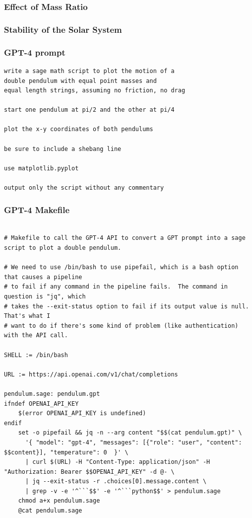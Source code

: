 \documentclass{beamer}
\begin{document}
\begin{frame}
\frametitle{Effect of Mass Ratio}
\end{frame}

\begin{frame}
\frametitle{Stability of the Solar System}
\end{frame}

\begin{frame}[fragile]
\frametitle{GPT-4 prompt}
\begin{verbatim}
write a sage math script to plot the motion of a
double pendulum with equal point masses and
equal length strings, assuming no friction, no drag

start one pendulum at pi/2 and the other at pi/4

plot the x-y coordinates of both pendulums

be sure to include a shebang line

use matplotlib.pyplot

output only the script without any commentary

\end{verbatim}
\end{frame}

\begin{frame}[fragile]
\frametitle{GPT-4 Makefile}
\begin{Verbatim}[fontsize=\tiny]

# Makefile to call the GPT-4 API to convert a GPT prompt into a sage script to plot a double pendulum.

# We need to use /bin/bash to use pipefail, which is a bash option that causes a pipeline
# to fail if any command in the pipeline fails.  The command in question is "jq", which
# takes the --exit-status option to fail if its output value is null.  That's what I
# want to do if there's some kind of problem (like authentication) with the API call.

SHELL := /bin/bash

URL := https://api.openai.com/v1/chat/completions

pendulum.sage: pendulum.gpt
ifndef OPENAI_API_KEY
	$(error OPENAI_API_KEY is undefined)
endif
	set -o pipefail && jq -n --arg content "$$(cat pendulum.gpt)" \
	  '{ "model": "gpt-4", "messages": [{"role": "user", "content": $$content}], "temperature": 0  }' \
	  | curl $(URL) -H "Content-Type: application/json" -H "Authorization: Bearer $$OPENAI_API_KEY" -d @- \
	  | jq --exit-status -r .choices[0].message.content \
	  | grep -v -e '^```$$' -e '^```python$$' > pendulum.sage
	chmod a+x pendulum.sage
	@cat pendulum.sage
\end{Verbatim}
\end{frame}
\end{document}
